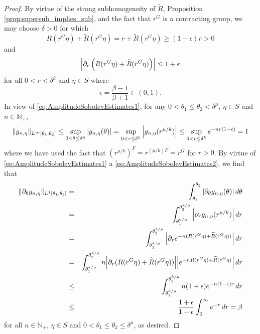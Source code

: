 \documentclass[11pt]{article}
\theoremstyle{remark}
\newcommand{\p}{\partial}
\begin{document}
\begin{proof}
By virtue of the strong subhomogeneity of $\widetilde{R}$, Proposition \ref{prop:supersub_implies_sub}, and the fact that $r^G$ is a contracting group, we may choose $\delta>0$ for which 
\begin{equation}\label{eq:AmplitudeSobolevEstimates1}
    R(r^G\eta)+\widetilde{R}\left(r^G\eta\right)=r+\widetilde{R}\left(r^G\eta\right)\geq (1-\epsilon)r>0
\end{equation}
and
\begin{equation}\label{eq:AmplitudeSobolevEstimates2}
    \abs{\partial_r\left(R(r^G\eta)+\widetilde{R}(r^G\eta)\right)}\leq 1+\epsilon
\end{equation}
for all $0<r<\delta^k$ and $\eta\in S$ where
\begin{equation*}
    \epsilon=\frac{\beta-1}{\beta+1}\in(0,1).
\end{equation*}
In view of \eqref{eq:AmplitudeSobolevEstimates1}, for any $0<\theta_1\leq\theta_2<\delta^{\mu}$, $\eta\in S$ and $n\in\mathbb{N}_+$,
\begin{equation*}
\|g_{n,\eta}\|_{L^\infty[\theta_1,\theta_2]}\leq\sup_{0<\theta\leq\delta^{\mu}}\abs{g_{n,\eta}(\theta)}=\sup_{0<r\leq\delta^k}\abs{g_{n,\eta}(r^{\mu/k})}\leq \sup_{0<r\leq \delta^k}e^{-nr(1-\epsilon)}= 1
\end{equation*}
where we have used the fact that $(r^{\mu/k})^F=r^{(\mu/k)F}=r^G$ for $r>0$. By virtue of \eqref{eq:AmplitudeSobolevEstimates1} a \eqref{eq:AmplitudeSobolevEstimates2}, we find that
\begin{eqnarray*}
\|\partial_{\theta}g_{n,\eta}\|_{L^1[\theta_1,\theta_2]}
&=&\int_{\theta_1}^{\theta_2}\abs{\p_\theta g_{n,\eta}(\theta)}\,d\theta\\
&=&\int_{\theta_1^{k/\mu}}^{\theta_2^{k/\mu}}\abs{\p_r g_{n,\eta}(r^{\mu/k})}\,dr\\
&=&\int_{\theta_1^{k/\mu}}^{\theta_2^{k/\mu}}\abs{\p_r e^{-n(R(r^G\eta)+\widetilde{R}(r^G\eta))} }\,dr\\
&=&\int_{\theta_1^{k/\mu}}^{\theta_2^{k/\mu}}n\abs{\partial_r(R(r^G\eta)+\widetilde{R}(r^G\eta))}\abs{e^{-nR(r^G\eta)+\widetilde{R}(r^G\eta)}}\,dr\\
&\leq&\int_{\theta_1^{k/\mu}}^{\theta_2^{k/\mu}}n(1+\epsilon)e^{-n(1-\epsilon)r}\,dr\\
&\leq &\frac{1+\epsilon}{1-\epsilon}\int_0^\infty e^{-r}\,dr=\beta
\end{eqnarray*}
for all $n\in\mathbb{N}_+$, $\eta\in S$ and $0<\theta_1\leq\theta_2\leq\delta^{\mu}$, as desired.
\end{proof}
\end{document}
